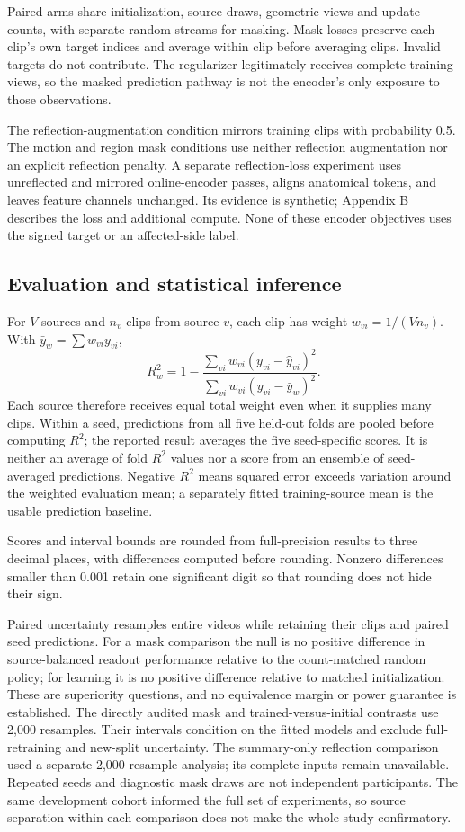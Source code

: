 \documentclass{article}
\begin{document}
Paired arms share initialization, source draws, geometric views and update counts, with separate random streams for masking. Mask losses preserve each clip's own target indices and average within clip before averaging clips. Invalid targets do not contribute. The regularizer legitimately receives complete training views, so the masked prediction pathway is not the encoder's only exposure to those observations.

The reflection-augmentation condition mirrors training clips with probability 0.5. The motion and region mask conditions use neither reflection augmentation nor an explicit reflection penalty. A separate reflection-loss experiment uses unreflected and mirrored online-encoder passes, aligns anatomical tokens, and leaves feature channels unchanged. Its evidence is synthetic; Appendix B describes the loss and additional compute. None of these encoder objectives uses the signed target or an affected-side label.

\subsection{Evaluation and statistical inference}\label{evaluation-and-statistical-inference}

For \(V\) sources and \(n_v\) clips from source \(v\), each clip has weight \(w_{vi}=1/(Vn_v)\). With \(\bar y_w=\sum w_{vi}y_{vi}\), \[
R^2_w=1-\frac{\sum_{vi}w_{vi}(y_{vi}-\hat y_{vi})^2}
{\sum_{vi}w_{vi}(y_{vi}-\bar y_w)^2}.
\] Each source therefore receives equal total weight even when it supplies many clips. Within a seed, predictions from all five held-out folds are pooled before computing \(R^2\); the reported result averages the five seed-specific scores. It is neither an average of fold \(R^2\) values nor a score from an ensemble of seed-averaged predictions. Negative \(R^2\) means squared error exceeds variation around the weighted evaluation mean; a separately fitted training-source mean is the usable prediction baseline.

Scores and interval bounds are rounded from full-precision results to three decimal places, with differences computed before rounding. Nonzero differences smaller than 0.001 retain one significant digit so that rounding does not hide their sign.

Paired uncertainty resamples entire videos while retaining their clips and paired seed predictions. For a mask comparison the null is no positive difference in source-balanced readout performance relative to the count-matched random policy; for learning it is no positive difference relative to matched initialization. These are superiority questions, and no equivalence margin or power guarantee is established. The directly audited mask and trained-versus-initial contrasts use 2,000 resamples. Their intervals condition on the fitted models and exclude full-retraining and new-split uncertainty. The summary-only reflection comparison used a separate 2,000-resample analysis; its complete inputs remain unavailable. Repeated seeds and diagnostic mask draws are not independent participants. The same development cohort informed the full set of experiments, so source separation within each comparison does not make the whole study confirmatory.
\end{document}

